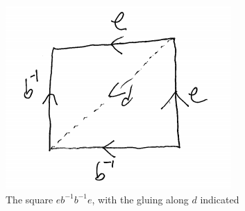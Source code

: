 \documentclass[english]{article}
\theoremstyle{remark}
\theoremstyle{definition}
\begin{document}
\begin{figure}[h]\centering
	\includegraphics[scale=.6]{3-3fig4}\caption{The square $eb^{-1}b^{-1}e$, with the gluing along $d$ indicated \label{fig4}}
\end{figure}
\end{document}
